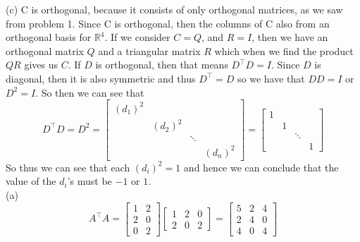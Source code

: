 \documentclass{report}
\begin{document}
(c) C is orthogonal, because it consists of only orthogonal matrices, as we saw from problem 1. Since C is orthogonal, then the columns of C also from an orthogonal basis for $\mathbb{R}^4$. If we consider $C = Q$, and $R = I$, then we have an orthogonal matrix $Q$ and a triangular matrix $R$ which when we find the product $QR$ gives us $C$.
\newpage
{}
\sol If $D$ is orthogonal, then that means $D^\top D=I$. Since $D$ is diagonal, then it is also symmetric and thus $D^\top = D$ so we have that $DD=I$ or $D^2 = I$. So then we can see that 
$$
D^\top D = D^2 = \begin{bmatrix}
(d_1)^2&&&\\
&(d_2)^2&&\\
&&\ddots&\\
&&&(d_n)^2
\end{bmatrix} = \begin{bmatrix}
1&&&\\
&1&&\\
&&\ddots&\\
&&&1
\end{bmatrix}
$$
So thus we can see that each $(d_i)^2 = 1$ and hence we can conclude that the value of the $d_i$'s must be $-1$ or $1$.
\sol \\
(a)
$$
A^\top A = \begin{bmatrix}
1&2\\
2&0\\
0&2
\end{bmatrix} \begin{bmatrix}
1&2&0\\
2&0&2
\end{bmatrix} = \begin{bmatrix}
5&2&4\\
2&4&0\\
4&0&4
\end{bmatrix}
$$
\end{document}
